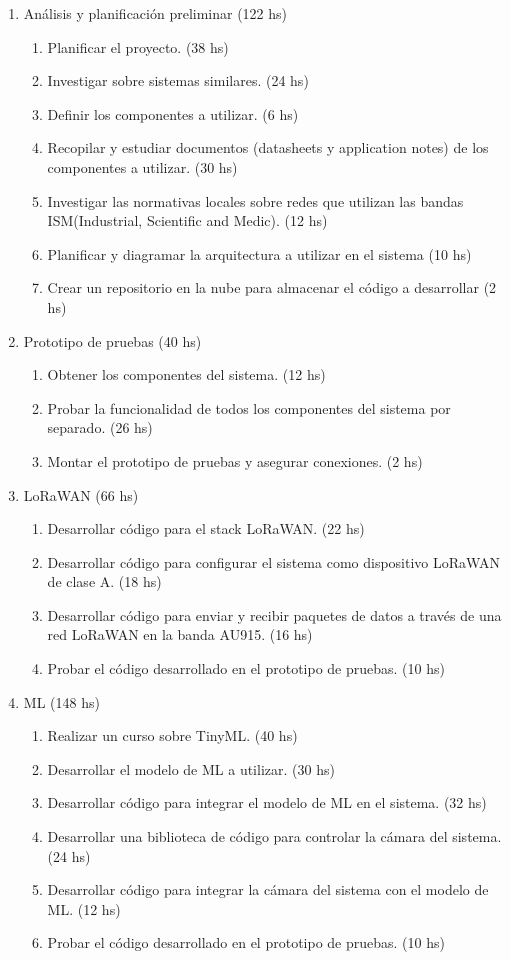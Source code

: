 \documentclass[
11pt, %
codirector, %
]{plan}
\begin{document}
\begin{enumerate}
\item Análisis y planificación preliminar (122 hs)
	\begin{enumerate}
		\item Planificar el proyecto. (38 hs)
		\item Investigar sobre sistemas similares. (24 hs)
		\item Definir los componentes a utilizar. (6 hs)
		\item Recopilar y estudiar documentos (datasheets y application notes) de los componentes a utilizar. (30 hs)
		\item Investigar las normativas locales sobre redes que utilizan las bandas ISM(Industrial, Scientific and Medic). (12 hs)
		\item Planificar y diagramar la arquitectura a utilizar en el sistema (10 hs)
		\item Crear un repositorio en la nube para almacenar el código a desarrollar (2 hs)
	\end{enumerate}
	
\item Prototipo de pruebas (40 hs)
	\begin{enumerate}
		\item Obtener los componentes del sistema. (12 hs)
		\item Probar la funcionalidad de todos los componentes del sistema por separado. (26 hs)
		\item Montar el prototipo de pruebas y asegurar conexiones. (2 hs)
	\end{enumerate}
	
\item LoRaWAN (66 hs)
	\begin{enumerate}
		\item Desarrollar código para el stack LoRaWAN. (22 hs)
		\item Desarrollar código para configurar el sistema como dispositivo LoRaWAN de clase A. (18 hs)
		\item Desarrollar código para enviar y recibir paquetes de datos a través de una red LoRaWAN en la banda AU915. (16 hs)
		\item Probar el código desarrollado en el prototipo de pruebas. (10 hs)
	\end{enumerate}
	
\item ML (148 hs)
	\begin{enumerate}
		\item Realizar un curso sobre TinyML. (40 hs)
		\item Desarrollar el modelo de ML a utilizar. (30 hs)
		\item Desarrollar código para integrar el modelo de ML en el sistema. (32 hs)
		\item Desarrollar una biblioteca de código para controlar la cámara del sistema. (24 hs)
		\item Desarrollar código para integrar la cámara del sistema con el modelo de ML. (12 hs)
		\item Probar el código desarrollado en el prototipo de pruebas. (10 hs)
	\end{enumerate}


\end{enumerate}
\end{document}
